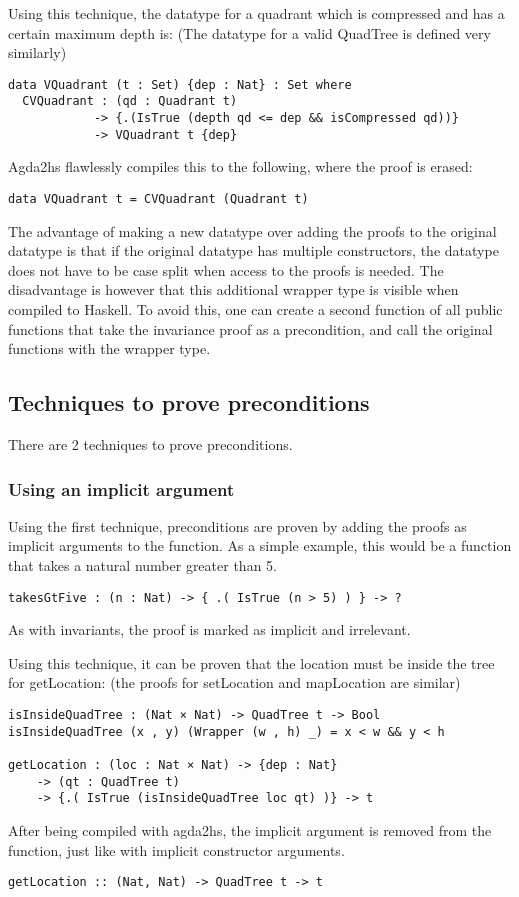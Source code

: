 Using this technique, the datatype for a quadrant which is compressed and has a certain maximum depth is: (The datatype for a valid QuadTree is defined very similarly)
\begin{verbatim}
data VQuadrant (t : Set) {dep : Nat} : Set where
  CVQuadrant : (qd : Quadrant t) 
            -> {.(IsTrue (depth qd <= dep && isCompressed qd))} 
            -> VQuadrant t {dep}
\end{verbatim}
Agda2hs flawlessly compiles this to the following, where the proof is erased:
\begin{verbatim}
data VQuadrant t = CVQuadrant (Quadrant t)
\end{verbatim}

The advantage of making a new datatype over adding the proofs to the original datatype is that if the original datatype has multiple constructors, the datatype does not have to be case split when access to the proofs is needed. The disadvantage is however that this additional wrapper type is visible when compiled to Haskell. To avoid this, one can create a second function of all public functions that take the invariance proof as a precondition, and call the original functions with the wrapper type. 

\subsection{Techniques to prove preconditions}
There are 2 techniques to prove preconditions.

\subsubsection{Using an implicit argument}
Using the first technique, preconditions are proven by adding the proofs as implicit arguments to the function.
As a simple example, this would be a function that takes a natural number greater than 5.
\begin{verbatim}
takesGtFive : (n : Nat) -> { .( IsTrue (n > 5) ) } -> ?
\end{verbatim}
As with invariants, the proof is marked as implicit and irrelevant. 

Using this technique, it can be proven that the location must be inside the tree for getLocation: (the proofs for setLocation and mapLocation are similar)
\begin{verbatim}
isInsideQuadTree : (Nat × Nat) -> QuadTree t -> Bool
isInsideQuadTree (x , y) (Wrapper (w , h) _) = x < w && y < h

getLocation : (loc : Nat × Nat) -> {dep : Nat} 
    -> (qt : QuadTree t) 
    -> {.( IsTrue (isInsideQuadTree loc qt) )} -> t
\end{verbatim}
After being compiled with agda2hs, the implicit argument is removed from the function, just like with implicit constructor arguments.
\begin{verbatim}
getLocation :: (Nat, Nat) -> QuadTree t -> t
\end{verbatim}

